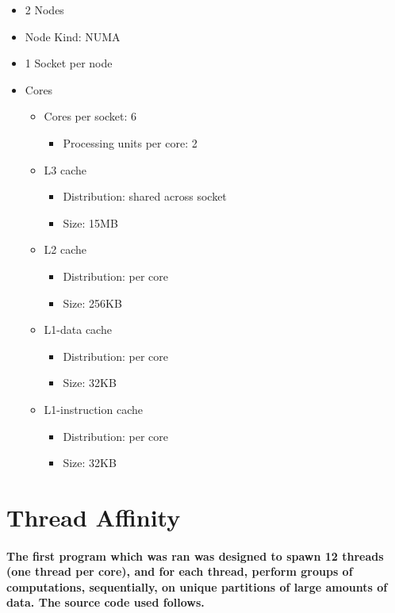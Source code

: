 \documentclass{article}
\begin{document}
\begin{itemize}
\item 2 Nodes
\item Node Kind: NUMA
\item 1 Socket per node
\item Cores  
  \begin{itemize}
  \item Cores per socket: 6
    \begin{itemize}
    \item Processing units per core: 2
    \end{itemize}
  \item L3 cache
    \begin{itemize}
    \item Distribution: shared across socket
    \item Size: 15MB
    \end{itemize}
  \item L2 cache
    \begin{itemize}
    \item Distribution: per core
    \item Size: 256KB
    \end{itemize}
  \item L1-data cache
    \begin{itemize}
    \item Distribution: per core
    \item Size: 32KB
    \end{itemize}
  \item L1-instruction cache
    \begin{itemize}
    \item Distribution: per core
    \item Size: 32KB
    \end{itemize}
  \end{itemize}
\end{itemize}

\section {Thread Affinity}

\paragraph {The first program which was ran was designed to spawn 12 threads (one thread per core), and for each thread,
perform groups of computations, sequentially, on unique partitions of large amounts of data. The source code used follows.}
\end{document}
